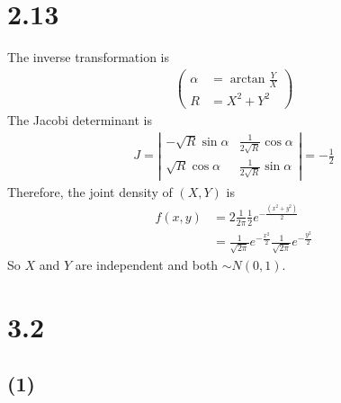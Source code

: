 \documentclass[11pt]{article}
\begin{document}
    \hypertarget{section}{%
\section{2.13}\label{section}}

    The inverse transformation is \begin{align}
    \left(
        \begin{array}{ll}
            \alpha&= \arctan\frac{Y}{X} \\
            R&= X^2+Y^2
        \end{array}
    \right)
\end{align} The Jacobi determinant is \begin{align}
    J=\left|
    \begin{array}{ll}
        -\sqrt{R}\sin\alpha & \frac{1}{2\sqrt{R}}\cos\alpha \\
        \sqrt{R}\cos\alpha & \frac{1}{2\sqrt{R}}\sin\alpha
    \end{array}
    \right| = -\frac{1}{2}
\end{align} Therefore, the joint density of \((X,Y)\) is \begin{align}
    f(x,y)&=2\frac{1}{2\pi}\frac{1}{2}e^{-\frac{(x^2+y^2)}{2}} \\
    &= \frac{1}{\sqrt{2\pi}}e^{-\frac{x^2}{2}}\frac{1}{\sqrt{2\pi}}e^{-\frac{y^2}{2}}
\end{align} So \(X\) and \(Y\) are independent and both \(\sim N(0,1)\).

    \hypertarget{section}{%
\section{3.2}\label{section}}

    \hypertarget{section}{%
\subsection{(1)}\label{section}}
\end{document}
